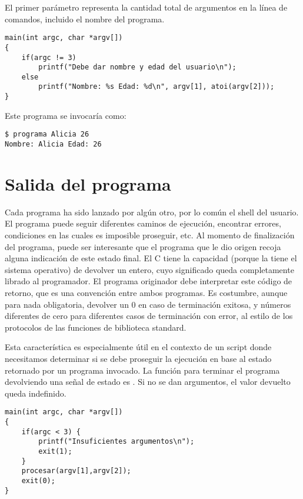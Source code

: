 \begin{ejemplo}
El primer parámetro representa la cantidad total de argumentos en la
      línea de comandos, incluido el nombre del programa.

\begin{lstlisting}
main(int argc, char *argv[])
{
    if(argc != 3)
        printf("Debe dar nombre y edad del usuario\n");
    else
        printf("Nombre: %s Edad: %d\n", argv[1], atoi(argv[2]));
}	
\end{lstlisting}

Este programa se invocaría como:
\begin{lstlisting}
$ programa Alicia 26
Nombre: Alicia Edad: 26
\end{lstlisting}
\end{ejemplo}

\section{Salida del programa}
Cada programa ha sido lanzado por algún otro, por lo común el shell del
usuario. El programa puede seguir diferentes caminos de ejecución, encontrar
errores, condiciones en las cuales es imposible proseguir, etc. Al momento de
finalización del programa, puede ser interesante que el programa que le dio
origen recoja alguna indicación de este estado final. El C tiene la capacidad
(porque la tiene el sistema operativo) de devolver un entero, cuyo significado
queda completamente librado al programador. El programa originador debe
interpretar este código de retorno, que es una convención entre ambos
programas. Es costumbre, aunque para nada obligatoria, devolver un 0 en caso de
terminación exitosa, y números diferentes de cero para diferentes casos de
terminación con error, al estilo de los protocolos de las funciones de
biblioteca standard.

Esta característica es especialmente útil en el contexto de un script donde
necesitamos determinar si se debe proseguir la ejecución en base al estado
retornado por un programa invocado.
La función para terminar el programa devolviendo una señal de estado es .
Si no se dan argumentos, el valor devuelto queda indefinido.


\begin{ejemplo}
\begin{lstlisting}
main(int argc, char *argv[])
{
    if(argc < 3) {
        printf("Insuficientes argumentos\n");
        exit(1);
    }
    procesar(argv[1],argv[2]);
    exit(0);
}
\end{lstlisting}
\end{ejemplo}


